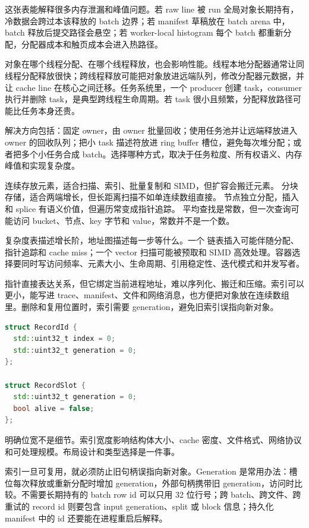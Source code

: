 这张表能解释很多内存泄漏和峰值问题。若 raw line 被 run 全局对象长期持有，冷数据会跨过本该释放的 batch 边界；若 manifest 草稿放在 batch arena 中，batch 释放后提交路径会悬空；若 worker-local histogram 每个 batch 都重新分配，分配器成本和触页成本会进入热路径。

对象在哪个线程分配、在哪个线程释放，也会影响性能。线程本地分配器通常让同线程分配释放很快；跨线程释放可能把对象放进远端队列，修改分配器元数据，并让 cache line 在核心之间迁移。任务系统里，一个 producer 创建 task，consumer 执行并删除 task，是典型跨线程生命周期。若 task 很小且频繁，分配释放路径可能比任务本身还贵。

解决方向包括：固定 owner，由 owner 批量回收；使用任务池并让远端释放进入 owner 的回收队列；把小 task 描述符放进 ring buffer 槽位，避免每次堆分配；或者把多个小任务合成 batch。选择哪种方式，取决于任务粒度、所有权语义、内存峰值和实现复杂度。

 连续存放元素，适合扫描、索引、批量复制和 SIMD，但扩容会搬迁元素。 分块存储，适合两端增长，但长距离扫描不如单连续数组直接。 节点独立分配，插入和 splice 有语义价值，但遍历常变成指针追踪。 平均查找是常数，但一次查询可能访问 bucket、节点、key 字节和 value，常数并不是一个数。

复杂度表描述增长阶，地址图描述每一步等什么。一个  链表插入可能伴随分配、指针追踪和 cache miss；一个  vector 扫描可能被预取和 SIMD 高效处理。容器选择要同时写访问频率、元素大小、生命周期、引用稳定性、迭代模式和并发写者。

指针直接表达关系，但它绑定当前进程地址，难以序列化、搬迁和压缩。索引可以更小，能写进 trace、manifest、文件和网络消息，也方便把对象放在连续数组里。删除和复用位置时，索引需要 generation，避免旧索引误指向新对象。

\begin{lstlisting}[language=C++,caption={索引加 generation 的稳定句柄}]
struct RecordId {
  std::uint32_t index = 0;
  std::uint32_t generation = 0;
};

struct RecordSlot {
  std::uint32_t generation = 0;
  bool alive = false;
};
\end{lstlisting}

明确位宽不是细节。索引宽度影响结构体大小、cache 密度、文件格式、网络协议和可处理规模。布局设计和类型选择是一件事。

索引一旦可复用，就必须防止旧句柄误指向新对象。Generation 是常用办法：槽位每次释放或重新分配时增加 generation，外部句柄携带旧 generation，访问时比较。不需要长期持有的 batch row id 可以只用 32 位行号；跨 batch、跨文件、跨重试的 record id 则要包含 input generation、split 或 block 信息；持久化 manifest 中的 id 还要能在进程重启后解释。

